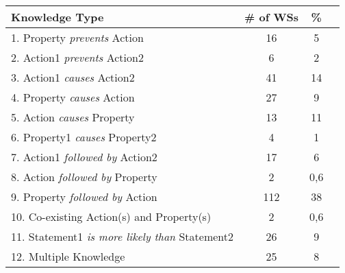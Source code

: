 

\noindent\begin{tabular}{ |l|c|c|l| }
    \hline
    \textbf{Knowledge Type} & \textbf{\# of WSs} & \% \\\hline
    1. Property \textit{prevents} Action  & 16 & 5\\\hline
    2. Action1 \textit{prevents} Action2  & 6 & 2\\\hline
    3. Action1 \textit{causes} Action2 & 41 & 14\\\hline
    4. Property \textit{causes} Action & 27 & 9\\\hline
    5. Action \textit{causes} Property & 13 & 11\\\hline
    6. Property1 \textit{causes} Property2 & 4 & 1\\\hline
    7. Action1 \textit{followed by} Action2  & 17 & 6\\\hline
    8. Action \textit{followed by} Property & 2 & 0,6\\\hline
    9. Property \textit{followed by} Action &112 & 38 \\\hline
    10. Co-existing Action(s) and Property(s)& 2 & 0,6\\\hline
    11. Statement1 \textit{is more likely than} Statement2 &26 & 9\\\hline
    12. Multiple Knowledge  &25 & 8  \\\hline
   
\end{tabular}


